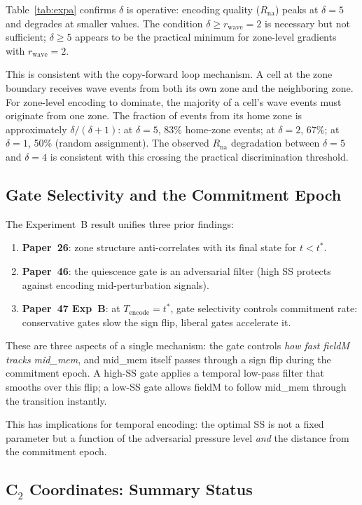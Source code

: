 \documentclass[11pt,a4paper]{article}
\begin{document}
Table~\ref{tab:expa} confirms $\delta$ is operative: encoding quality
($R_\text{na}$) peaks at $\delta = 5$ and degrades at smaller values.  The
condition $\delta \geq r_\text{wave} = 2$ is necessary but not sufficient;
$\delta \geq 5$ appears to be the practical minimum for zone-level gradients
with $r_\text{wave}=2$.

This is consistent with the copy-forward loop mechanism.  A cell at the zone
boundary receives wave events from both its own zone and the neighboring zone.
For zone-level encoding to dominate, the majority of a cell's wave events must
originate from one zone.  The fraction of events from its home zone is
approximately $\delta/(\delta+1)$: at $\delta=5$, 83\% home-zone events; at
$\delta=2$, 67\%; at $\delta=1$, 50\% (random assignment).  The observed
$R_\text{na}$ degradation between $\delta=5$ and $\delta=4$ is consistent with
this crossing the practical discrimination threshold.

\subsection{Gate Selectivity and the Commitment Epoch}

The Experiment~B result unifies three prior findings:
\begin{enumerate}
  \item \textbf{Paper~26}: zone structure anti-correlates with its final state
        for $t < t^*$.
  \item \textbf{Paper~46}: the quiescence gate is an adversarial filter (high
        SS protects against encoding mid-perturbation signals).
  \item \textbf{Paper~47 Exp~B}: at $T_\text{encode} = t^*$, gate selectivity
        controls commitment rate: conservative gates slow the sign flip, liberal
        gates accelerate it.
\end{enumerate}
These are three aspects of a single mechanism: the gate controls \emph{how fast
fieldM tracks mid\_mem}, and mid\_mem itself passes through a sign flip
during the commitment epoch.  A high-SS gate applies a temporal low-pass filter
that smooths over this flip; a low-SS gate allows fieldM to follow mid\_mem
through the transition instantly.

This has implications for temporal encoding: the optimal SS is not a fixed
parameter but a function of the adversarial pressure level \emph{and} the
distance from the commitment epoch.

\subsection{C$_2$ Coordinates: Summary Status}
\end{document}
